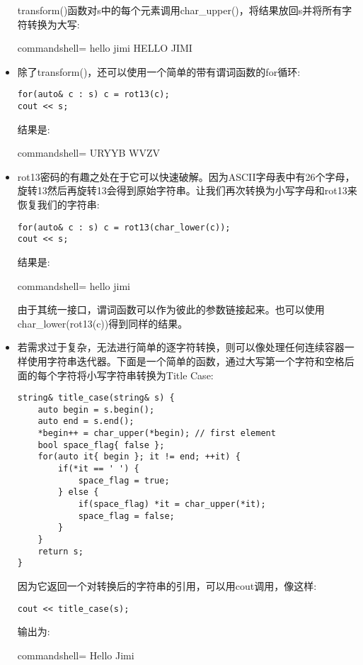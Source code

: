 \begin{itemize}
transform()函数对s中的每个元素调用char\_upper()，将结果放回s并将所有字符转换为大写:

\begin{tcblisting}{commandshell={}}
hello jimi
HELLO JIMI
\end{tcblisting}

\item 
除了transform()，还可以使用一个简单的带有谓词函数的for循环:

\begin{lstlisting}[style=styleCXX]
for(auto& c : s) c = rot13(c);
cout << s;
\end{lstlisting}

结果是:

\begin{tcblisting}{commandshell={}}
URYYB WVZV
\end{tcblisting}

\item 
rot13密码的有趣之处在于它可以快速破解。因为ASCII字母表中有26个字母，旋转13然后再旋转13会得到原始字符串。让我们再次转换为小写字母和rot13来恢复我们的字符串:

\begin{lstlisting}[style=styleCXX]
for(auto& c : s) c = rot13(char_lower(c));
cout << s;
\end{lstlisting}

结果是:

\begin{tcblisting}{commandshell={}}
hello jimi
\end{tcblisting}

由于其统一接口，谓词函数可以作为彼此的参数链接起来。也可以使用char\_lower(rot13(c))得到同样的结果。

\item 
若需求过于复杂，无法进行简单的逐字符转换，则可以像处理任何连续容器一样使用字符串迭代器。下面是一个简单的函数，通过大写第一个字符和空格后面的每个字符将小写字符串转换为Title Case:

\begin{lstlisting}[style=styleCXX]
string& title_case(string& s) {
	auto begin = s.begin();
	auto end = s.end();
	*begin++ = char_upper(*begin); // first element
	bool space_flag{ false };
	for(auto it{ begin }; it != end; ++it) {
		if(*it == ' ') {
			space_flag = true;
		} else {
			if(space_flag) *it = char_upper(*it);
			space_flag = false;
		}
	}
	return s;
}
\end{lstlisting}

因为它返回一个对转换后的字符串的引用，可以用cout调用，像这样:

\begin{lstlisting}[style=styleCXX]
cout << title_case(s);
\end{lstlisting}

输出为:

\begin{tcblisting}{commandshell={}}
Hello Jimi
\end{tcblisting}

\end{itemize}

